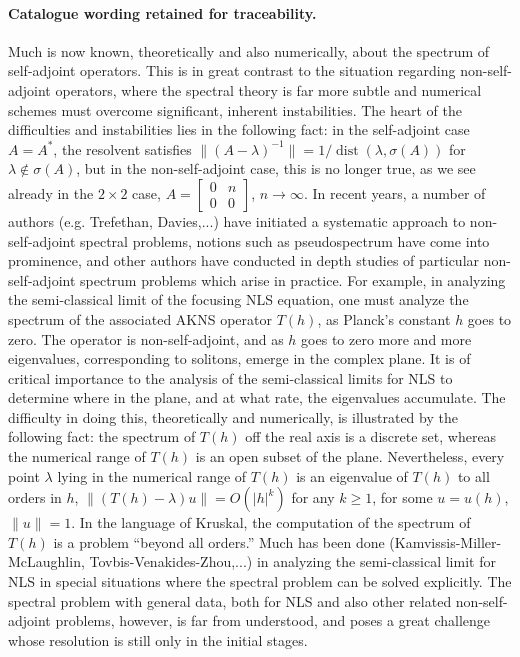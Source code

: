 \paragraph{Catalogue wording retained for traceability.}
Much is now known, theoretically and also numerically, about the spectrum of self-adjoint operators. This is in great contrast to the situation regarding non-self-adjoint operators, where the spectral theory is far more subtle and numerical schemes must overcome significant, inherent instabilities. The heart of the difficulties and instabilities lies in the following fact: in the self-adjoint case $A=A^*$, the resolvent satisfies $\|(A-\lambda)^{-1}\|=1/\operatorname{dist}(\lambda,\sigma(A))$ for $\lambda\notin\sigma(A)$, but in the non-self-adjoint case, this is no longer true, as we see already in the $2\times2$ case, $A=\begin{bmatrix}0&n\\0&0\end{bmatrix}$, $n\to\infty$. In recent years, a number of authors (e.g. Trefethan, Davies,...) have initiated a systematic approach to non-self-adjoint spectral problems, notions such as pseudospectrum have come into prominence, and other authors have conducted in depth studies of particular non-self-adjoint spectrum problems which arise in practice. For example, in analyzing the semi-classical limit of the focusing NLS equation, one must analyze the spectrum of the associated AKNS operator $T(h)$, as Planck's constant $h$ goes to zero. The operator is non-self-adjoint, and as $h$ goes to zero more and more eigenvalues, corresponding to solitons, emerge in the complex plane. It is of critical importance to the analysis of the semi-classical limits for NLS to determine where in the plane, and at what rate, the eigenvalues accumulate. The difficulty in doing this, theoretically and numerically, is illustrated by the following fact: the spectrum of $T(h)$ off the real axis is a discrete set, whereas the numerical range of $T(h)$ is an open subset of the plane. Nevertheless, every point $\lambda$ lying in the numerical range of $T(h)$ is an eigenvalue of $T(h)$ to all orders in $h$, $\|(T(h)-\lambda)u\|=O(|h|^k)$ for any $k\geq 1$, for some $u=u(h)$, $\|u\|=1$. In the language of Kruskal, the computation of the spectrum of $T(h)$ is a problem ``beyond all orders.'' Much has been done (Kamvissis-Miller-McLaughlin, Tovbis-Venakides-Zhou,...) in analyzing the semi-classical limit for NLS in special situations where the spectral problem can be solved explicitly. The spectral problem with general data, both for NLS and also other related non-self-adjoint problems, however, is far from understood, and poses a great challenge whose resolution is still only in the initial stages.
